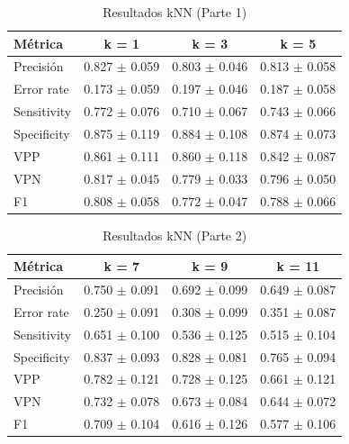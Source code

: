\documentclass[a4paper,10pt]{article}
\begin{document}
    \begin{table}[h!]
    \centering
    \caption{Resultados kNN (Parte 1)}
    \begin{tabular}{lccc}
    \toprule
    Métrica & k = 1 & k = 3 & k = 5 \\
    \midrule
    Precisión & 0.827 $\pm$ 0.059 & 0.803 $\pm$ 0.046 & 0.813 $\pm$ 0.058 \\
    Error rate & 0.173 $\pm$ 0.059 & 0.197 $\pm$ 0.046 & 0.187 $\pm$ 0.058 \\
    Sensitivity & 0.772 $\pm$ 0.076 & 0.710 $\pm$ 0.067 & 0.743 $\pm$ 0.066 \\
    Specificity & 0.875 $\pm$ 0.119 & 0.884 $\pm$ 0.108 & 0.874 $\pm$ 0.073 \\
    VPP & 0.861 $\pm$ 0.111 & 0.860 $\pm$ 0.118 & 0.842 $\pm$ 0.087 \\
    VPN & 0.817 $\pm$ 0.045 & 0.779 $\pm$ 0.033 & 0.796 $\pm$ 0.050 \\
    F1 & 0.808 $\pm$ 0.058 & 0.772 $\pm$ 0.047 & 0.788 $\pm$ 0.066 \\
    \bottomrule
    \end{tabular}
    \label{tab:knn_1_5}
    \end{table}
    \begin{table}[h!]
    \centering
    \caption{Resultados kNN (Parte 2)}
    \begin{tabular}{lccc}
    \toprule
    Métrica & k = 7 & k = 9 & k = 11 \\
    \midrule
    Precisión & 0.750 $\pm$ 0.091 & 0.692 $\pm$ 0.099 & 0.649 $\pm$ 0.087 \\
    Error rate & 0.250 $\pm$ 0.091 & 0.308 $\pm$ 0.099 & 0.351 $\pm$ 0.087 \\
    Sensitivity & 0.651 $\pm$ 0.100 & 0.536 $\pm$ 0.125 & 0.515 $\pm$ 0.104 \\
    Specificity & 0.837 $\pm$ 0.093 & 0.828 $\pm$ 0.081 & 0.765 $\pm$ 0.094 \\
    VPP & 0.782 $\pm$ 0.121 & 0.728 $\pm$ 0.125 & 0.661 $\pm$ 0.121 \\
    VPN & 0.732 $\pm$ 0.078 & 0.673 $\pm$ 0.084 & 0.644 $\pm$ 0.072 \\
    F1 & 0.709 $\pm$ 0.104 & 0.616 $\pm$ 0.126 & 0.577 $\pm$ 0.106 \\
    \bottomrule
    \end{tabular}
    \label{tab:knn_7_11}
    \end{table}

    
    \newpage
\end{document}
